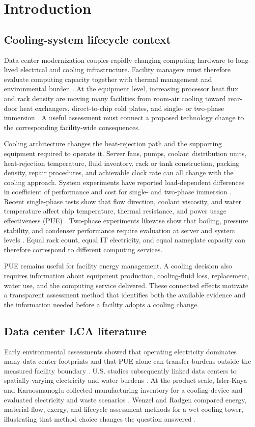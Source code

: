 \documentclass[review,a4paper,fleqn]{cas-sc}
\begin{document}
\section{Introduction}
\subsection{Cooling-system lifecycle context}
Data center modernization couples rapidly changing computing hardware to long-lived electrical and cooling infrastructure. Facility managers must therefore evaluate computing capacity together with thermal management and environmental burden \cite{ref1,ref2}. At the equipment level, increasing processor heat flux and rack density are moving many facilities from room-air cooling toward rear-door heat exchangers, direct-to-chip cold plates, and single- or two-phase immersion \cite{ref3,ref4,ref5}. A useful assessment must connect a proposed technology change to the corresponding facility-wide consequences.

Cooling architecture changes the heat-rejection path and the supporting equipment required to operate it. Server fans, pumps, coolant distribution units, heat-rejection temperature, fluid inventory, rack or tank construction, packing density, repair procedures, and achievable clock rate can all change with the cooling approach. System experiments have reported load-dependent differences in coefficient of performance and cost for single- and two-phase immersion \cite{ref6}. Recent single-phase tests show that flow direction, coolant viscosity, and water temperature affect chip temperature, thermal resistance, and power usage effectiveness (PUE) \cite{ref7}. Two-phase experiments likewise show that boiling, pressure stability, and condenser performance require evaluation at server and system levels \cite{ref8}. Equal rack count, equal IT electricity, and equal nameplate capacity can therefore correspond to different computing services.

PUE remains useful for facility energy management. A cooling decision also requires information about equipment production, cooling-fluid loss, replacement, water use, and the computing service delivered. These connected effects motivate a transparent assessment method that identifies both the available evidence and the information needed before a facility adopts a cooling change.

\subsection{Data center LCA literature}
Early environmental assessments showed that operating electricity dominates many data center footprints and that PUE alone can transfer burdens outside the measured facility boundary \cite{ref9}. U.S. studies subsequently linked data centers to spatially varying electricity and water burdens \cite{ref10,ref11}. At the product scale, Isler-Kaya and Karaosmanoglu collected manufacturing inventory for a cooling device and evaluated electricity and waste scenarios \cite{ref12}. Wenzel and Radgen compared energy, material-flow, exergy, and lifecycle assessment methods for a wet cooling tower, illustrating that method choice changes the question answered \cite{ref13}.
\end{document}
